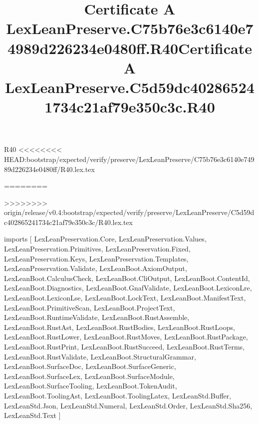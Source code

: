 \begin{lexlean}{R40}
<<<<<<<< HEAD:bootstrap/expected/verify/preserve/LexLeanPreserve/C75b76e3c6140e74989d226234e0480ff/R40.lex.tex
\title{Certificate A LexLeanPreserve.C75b76e3c6140e74989d226234e0480ff.R40}
========
\title{Certificate A LexLeanPreserve.C5d59dc402865241734c21af79e350c3c.R40}
>>>>>>>> origin/release/v0.4:bootstrap/expected/verify/preserve/LexLeanPreserve/C5d59dc402865241734c21af79e350c3c/R40.lex.tex
\begin{coremodule}
imports [
  LexLeanPreservation.Core,
  LexLeanPreservation.Values,
  LexLeanPreservation.Primitives,
  LexLeanPreservation.Fixed,
  LexLeanPreservation.Keys,
  LexLeanPreservation.Templates,
  LexLeanPreservation.Validate,
  LexLeanBoot.AxiomOutput,
  LexLeanBoot.CalculusCheck,
  LexLeanBoot.CliOutput,
  LexLeanBoot.ContentId,
  LexLeanBoot.Diagnostics,
  LexLeanBoot.GnafValidate,
  LexLeanBoot.LexiconLre,
  LexLeanBoot.LexiconLse,
  LexLeanBoot.LockText,
  LexLeanBoot.ManifestText,
  LexLeanBoot.PrimitiveScan,
  LexLeanBoot.ProjectText,
  LexLeanBoot.RuntimeValidate,
  LexLeanBoot.RustAssemble,
  LexLeanBoot.RustAst,
  LexLeanBoot.RustBodies,
  LexLeanBoot.RustLoops,
  LexLeanBoot.RustLower,
  LexLeanBoot.RustMoves,
  LexLeanBoot.RustPackage,
  LexLeanBoot.RustPrint,
  LexLeanBoot.RustSucceed,
  LexLeanBoot.RustTerms,
  LexLeanBoot.RustValidate,
  LexLeanBoot.StructuralGrammar,
  LexLeanBoot.SurfaceDoc,
  LexLeanBoot.SurfaceGeneric,
  LexLeanBoot.SurfaceLex,
  LexLeanBoot.SurfaceModule,
  LexLeanBoot.SurfaceTooling,
  LexLeanBoot.TokenAudit,
  LexLeanBoot.ToolingAst,
  LexLeanBoot.ToolingLatex,
  LexLeanStd.Buffer,
  LexLeanStd.Json,
  LexLeanStd.Numeral,
  LexLeanStd.Order,
  LexLeanStd.Sha256,
  LexLeanStd.Text
]


\end{coremodule}
\end{lexlean}
